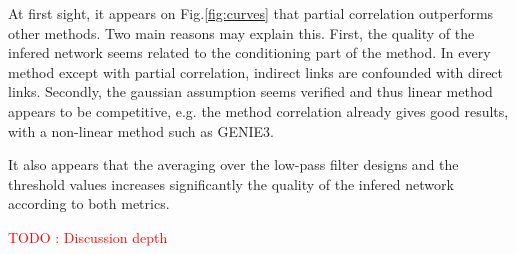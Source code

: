 \documentclass[wcp]{jmlr}
\begin{document}














At first sight, it appears on Fig.\ref{fig:curves} %
that partial correlation outperforms other methods. Two main reasons may explain
this. First, the quality of the infered network seems related to the
conditioning part of the method. In every method except with partial
correlation, indirect links are confounded with direct links.  Secondly, the
gaussian assumption seems verified and thus linear method appears to be
competitive, e.g. the method correlation already gives good results, with a
non-linear method such as GENIE3.


It also appears that the averaging over the low-pass filter designs and the
threshold values increases significantly the quality of the infered network
according to both metrics.


\textcolor{red}{TODO : Discussion depth}

\end{document}
